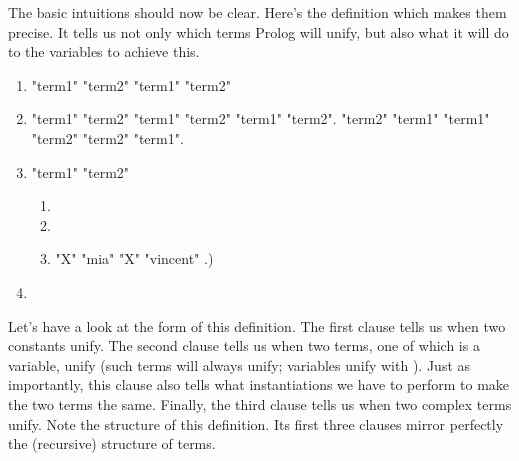 The basic intuitions should now be clear.  Here's the definition which
makes them precise. It tells us not only which terms Prolog will
unify, but also what it will do to the variables to achieve this.
\begin{enumerate}
\item{} "term1"  "term2" 
"term1"  "term2" 
\item{} "term1"  "term2"
 "term1"  "term2"
 "term1"  "term2".
 "term2"  "term1"
 "term1"  "term2"
 "term2"  "term1".

\item{} "term1"  "term2" 
\begin{enumerate}
\item{}
\item{}
\item{} "X"  "mia"
"X"  "vincent" .)
\end{enumerate}

\item{}
\end{enumerate}

Let's have a look at the form of this definition. The first clause
tells us when two constants unify. The second clause tells us when two
terms, one of which is a variable, unify (such terms will always
unify; variables unify with ). Just as importantly,
this clause also tells what instantiations we have to perform to make
the two terms the same. Finally, the third clause tells us when two
complex terms unify.  Note the structure of this definition. Its first
three clauses mirror perfectly the (recursive) structure of terms.



